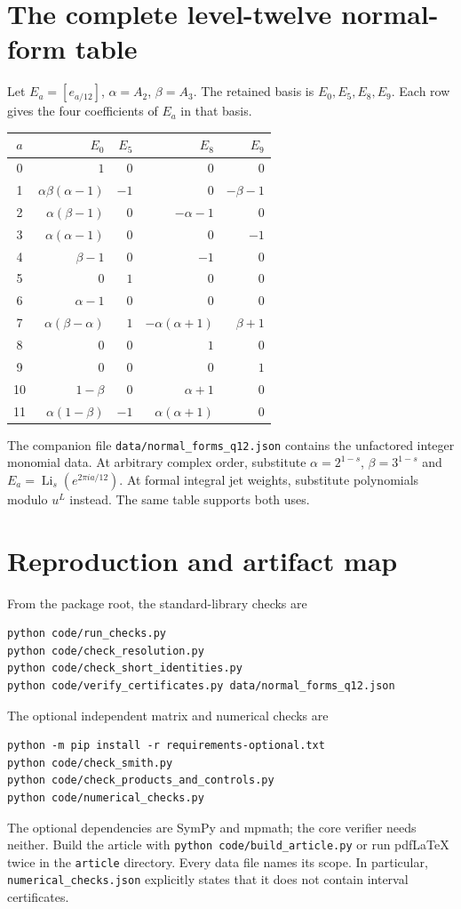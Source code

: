 \documentclass[11pt]{article}
\numberwithin{equation}{section}
\theoremstyle{definition}
\theoremstyle{remark}
\DeclareMathOperator{\Li}{Li}
\newcommand{\code}[1]{\texttt{\small #1}}
\begin{document}
\clearpage
\appendix
\section{The complete level-twelve normal-form table}
\label{app:q12}
Let $E_a=[e_{a/12}]$, $\alpha=A_2$, $\beta=A_3$.
The retained basis is $E_0,E_5,E_8,E_9$. Each row gives the four
coefficients of $E_a$ in that basis.
\begin{center}
\renewcommand{\arraystretch}{1.28}
\begin{tabular}{@{}c r r r r@{}}
\toprule
$a$&$E_0$&$E_5$&$E_8$&$E_9$\\
\midrule
0&$1$&$0$&$0$&$0$\\
1&$\alpha\beta(\alpha-1)$&$-1$&$0$&$-\beta-1$\\
2&$\alpha(\beta-1)$&$0$&$-\alpha-1$&$0$\\
3&$\alpha(\alpha-1)$&$0$&$0$&$-1$\\
4&$\beta-1$&$0$&$-1$&$0$\\
5&$0$&$1$&$0$&$0$\\
6&$\alpha-1$&$0$&$0$&$0$\\
7&$\alpha(\beta-\alpha)$&$1$&$-\alpha(\alpha+1)$&$\beta+1$\\
8&$0$&$0$&$1$&$0$\\
9&$0$&$0$&$0$&$1$\\
10&$1-\beta$&$0$&$\alpha+1$&$0$\\
11&$\alpha(1-\beta)$&$-1$&$\alpha(\alpha+1)$&$0$\\
\bottomrule
\end{tabular}
\end{center}
The companion file \code{data/normal\_forms\_q12.json} contains the
unfactored integer monomial data. At arbitrary complex order, substitute
$\alpha=2^{1-s}$, $\beta=3^{1-s}$ and
$E_a=\Li_s(e^{2\pi ia/12})$. At formal integral jet weights, substitute
polynomials modulo $u^L$ instead. The same table supports both uses.

\section{Reproduction and artifact map}
\label{app:artifacts}
From the package root, the standard-library checks are
\begin{verbatim}
python code/run_checks.py
python code/check_resolution.py
python code/check_short_identities.py
python code/verify_certificates.py data/normal_forms_q12.json
\end{verbatim}
The optional independent matrix and numerical checks are
\begin{verbatim}
python -m pip install -r requirements-optional.txt
python code/check_smith.py
python code/check_products_and_controls.py
python code/numerical_checks.py
\end{verbatim}
The optional dependencies are SymPy and mpmath; the core verifier needs
neither. Build the article with \code{python code/build\_article.py} or
run pdfLaTeX twice in the \code{article} directory. Every data file names
its scope. In particular, \code{numerical\_checks.json} explicitly
states that it does not contain interval certificates.
\end{document}
